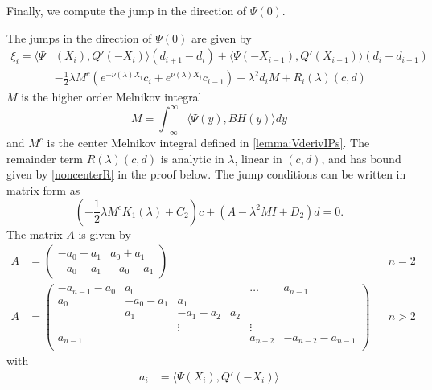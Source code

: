 \documentclass[thesis.tex]{subfiles}
\begin{document}
Finally, we compute the jump in the direction of $\Psi(0)$.

\begin{lemma}\label{jumpadj}
The jumps in the direction of $\Psi(0)$ are given by
\begin{equation}\label{jumpPsi0}
\begin{aligned}
\xi_i = \langle \Psi&(X_i), Q'(-X_i) \rangle (d_{i+1} - d_i ) + \langle \Psi(-X_{i-1}), Q'(X_{i-1}) \rangle (d_i - d_{i-1} ) \\
&-\frac{1}{2}\lambda M^c\left( e^{-\nu(\lambda)X_i}c_i + e^{\nu(\lambda)X_i}c_{i-1}\right)
- \lambda^2 d_i M + R_i(\lambda)(c, d)
\end{aligned}
\end{equation}
$M$ is the higher order Melnikov integral
\begin{equation}\label{defM2}
M = \int_{-\infty}^\infty \langle \Psi(y), B H(y) \rangle dy
\end{equation}
and $M^c$ is the center Melnikov integral defined in \cref{lemma:VderivIPs}. The remainder term $R(\lambda)(c, d)$ is analytic in $\lambda$, linear in $(c, d)$, and has bound given by \cref{noncenterR} in the proof below. The jump conditions can be written in matrix form as
\begin{equation}\label{Psimatrix}
\left(-\frac{1}{2} \lambda M^c K_1(\lambda) + C_2 \right)c + (A - \lambda^2 M I + D_2)d = 0.
\end{equation}
The matrix $A$ is given by
\begin{align*}
A &= \begin{pmatrix}
-a_0 -a_1 & a_0 + a_1  \\
-a_0 + a_1 & -a_0 - a_1
\end{pmatrix} && n = 2 \\
A &= \begin{pmatrix}
-a_{n-1} - a_0 & a_0 & & & \dots & a_{n-1}\\
a_0 & -a_0 - a_1 &  a_1   \\
& a_1 & -a_1 - a_2 &  a_2 \\
& & \vdots & & \vdots \\
a_{n-1} & & & & a_{n-2} & -a_{n-2} - a_{n-1} \\
\end{pmatrix} && n > 2
\end{align*}
with
\begin{align*}
a_i &= \langle \Psi(X_i), Q'(-X_i) \rangle \\
\end{align*}

\end{lemma}
\end{document}
